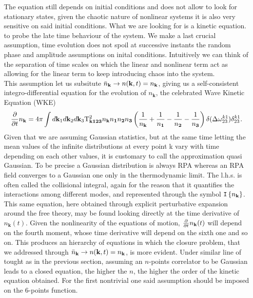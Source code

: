 The equation still depends on initial conditions and does not allow to look for stationary states, given the chaotic nature of nonlinear systems it is also very 
sensitive on said initial conditions. What we are looking for is a kinetic equation. to probe the late time behaviour of the system.
We make a last crucial assumption, time evolution does not spoil at successive instants the random phase and amplitude 
assumptions on inital conditions. Intuitively we can think of the separation of time scales on which the linear and nonlinear term act as allowing for 
the linear term to keep introducing chaos into the system. \\
This assumption let us subsitute $\bar{n}_\mathbf{k} \rightarrow n(\mathbf{k},t) = n_\mathbf{k}$, giving us a self-consistent 
integro-differential equation for the evolution of $n_\mathbf{k}$, the celebrated
Wave Kinetic Equation (WKE)
\begin{equation}
    \frac{\partial}{\partial t} n_\mathbf{k} = 4 \pi\int d\mathbf{k}_1 d\mathbf{k}_2 d\mathbf{k}_3 \\
    \mathrm{T}^2_\mathbf{k123}n_\mathbf{k}n_\mathbf{1}n_\mathbf{2}n_\mathbf{3}
    \left(\frac{1}{n_\mathbf{k}} + \frac{1}{n_\mathbf{1}} - \frac{1}{n_\mathbf{2}}- \frac{1}{n_\mathbf{3}}  \right)
    \delta(\Delta{\omega}^{k1}_{23})\delta^{k1}_{23}.
    \label{kinetic}
\end{equation}
Given that we are assuming Gaussian statistics, but at the same time letting the mean values of the infinite distributions at every point k 
vary with time depending on each other values, it is customary to call the approximation quasi Gaussian. To be precise a Gaussian distribution is always
RPA whereas an RPA field converges to a Gaussian one only in the thermodynamic limit. The l.h.s. is often called the collisional integral, again 
for the reason that it quantifies the interactions among different modes, and represented through the symbol $\mathtt{I}\left\{n_\mathbf{k}\right\}$. \\
This same equation, here obtained through explicit perturbative expansion around the free theory, may be found looking directly at the time 
derivative of $n_\mathbf{k}(t)$. 
Given the nonlinearity of the equations of motion, $\frac{\partial}{\partial t} n_\mathbf{k}(t)$ will depend on the fourth moment, whose time derivative will depend on the sixth one and so on. 
This produces an hierarchy of equations in which the closure problem, that we addressed through $\bar{n}_\mathbf{k} \rightarrow n(\mathbf{k},t) = n_\mathbf{k}$, 
is more evident. Under similar line of tought
as in the previous section, assuming an $n$-points correlator to be Gaussian leads to a closed equation, the higher the $n$, the higher 
the order of the kinetic equation obtained.
For the first nontrivial one said assumption should be imposed on the 6-points function.\\

